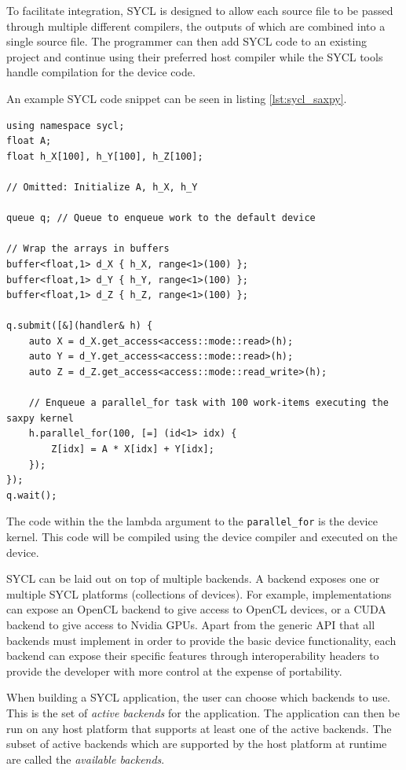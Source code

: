 To facilitate integration, SYCL is designed to allow each source file to be passed through multiple different compilers, the outputs of which are combined into a single source file. The programmer can then add SYCL code to an existing project and continue using their preferred host compiler while the SYCL tools handle compilation for the device code.

An example SYCL code snippet can be seen in listing \ref{lst:sycl_saxpy}.

\begin{lstlisting}[style=CStyle, caption=SYCL saxpy example, float, floatplacement=H, label={lst:sycl_saxpy}]
using namespace sycl;
float A;
float h_X[100], h_Y[100], h_Z[100];

// Omitted: Initialize A, h_X, h_Y

queue q; // Queue to enqueue work to the default device

// Wrap the arrays in buffers
buffer<float,1> d_X { h_X, range<1>(100) };
buffer<float,1> d_Y { h_Y, range<1>(100) };
buffer<float,1> d_Z { h_Z, range<1>(100) };

q.submit([&](handler& h) {
    auto X = d_X.get_access<access::mode::read>(h);
    auto Y = d_Y.get_access<access::mode::read>(h);
    auto Z = d_Z.get_access<access::mode::read_write>(h);

    // Enqueue a parallel_for task with 100 work-items executing the saxpy kernel
    h.parallel_for(100, [=] (id<1> idx) {
        Z[idx] = A * X[idx] + Y[idx];
    });
});
q.wait();
\end{lstlisting}

The code within the the lambda argument to the \texttt{parallel\_for} is the device kernel. This code will be compiled using the device compiler and executed on the device.

SYCL can be laid out on top of multiple backends. A backend exposes one or multiple SYCL platforms (collections of devices). For example, implementations can expose an OpenCL backend to give access to OpenCL devices, or a CUDA backend to give access to Nvidia GPUs. Apart from the generic API that all backends must implement in order to provide the basic device functionality, each backend can expose their specific features through interoperability headers to provide the developer with more control at the expense of portability.

When building a SYCL application, the user can choose which backends to use. This is the set of \textit{active backends} for the application. The application can then be run on any host platform that supports at least one of the active backends. The subset of active backends which are supported by the host platform at runtime are called the \textit{available backends}.

